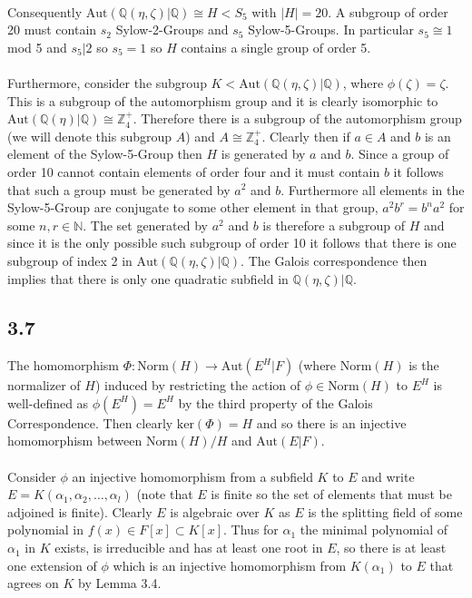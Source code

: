 \documentclass{article}
\begin{document}
\paragraph{}
Consequently $\text{Aut}(\mathbb{Q}(\eta,\zeta)|\mathbb{Q}) \cong H < S_5$ with $|H| = 20$. A subgroup 
of order 20 must contain $s_2$ Sylow-2-Groups and $s_5$ Sylow-5-Groups. In particular $s_5 \cong 1$ 
mod 5 and $s_5 | 2$ so $s_5 = 1$ 
so $H$ contains a single group of order 5.

\paragraph{}
Furthermore, consider the subgroup $K < \text{Aut}(\mathbb{Q}(\eta,\zeta)|\mathbb{Q})$, where 
$\phi(\zeta) = \zeta$. This is a subgroup of the automorphism group and it is clearly isomorphic 
to $\text{Aut}(\mathbb{Q}(\eta)|\mathbb{Q}) \cong \mathbb{Z}_4^+$. Therefore there is a subgroup of the 
automorphism group (we will denote this subgroup $A$) and $A \cong \mathbb{Z}_4^+$. Clearly then if $a \in A$ 
and $b$ is an element of the Sylow-5-Group then $H$ is generated by $a$ and $b$. Since a 
group of order 10 cannot contain elements of order four and it must contain $b$ it follows that 
such a group must be generated by $a^2$ and $b$. Furthermore all elements in the Sylow-5-Group 
are conjugate to some other element in that group, $a^2b^r = b^na^2$ for some $n,r \in \mathbb{N}$. 
The set generated by $a^2$ and $b$ is therefore a subgroup of $H$ and since it is the only 
possible such subgroup of order 10 it follows that there is one subgroup of index 2 in $\text{Aut}(\mathbb{Q}(\eta,\zeta)|\mathbb{Q})$. 
The Galois correspondence then implies that there is only one quadratic subfield in $\mathbb{Q}(\eta,\zeta)|\mathbb{Q}$.

\subsection*{3.7}
The homomorphism $\Phi:\text{Norm}(H) \rightarrow \text{Aut}(E^H|F)$ (where $\text{Norm}(H)$ is 
the normalizer of $H$) induced by restricting the 
action of $\phi \in \text{Norm}(H)$ to $E^H$ is well-defined as $\phi(E^H) = E^H$ by the third 
property of the Galois Correspondence. Then clearly $\text{ker}(\Phi) = H$ and so there is an 
injective homomorphism between $\text{Norm}(H)/H$ and $\text{Aut}(E|F)$.

\paragraph{}
Consider $\phi$ an injective homomorphism from a subfield $K$ to $E$ and write 
$E = K(\alpha_1,\alpha_2,\dots,\alpha_l)$ 
(note that $E$ is finite so the set of elements that must be adjoined is finite). 
Clearly $E$ is algebraic over $K$ as $E$ is the splitting field of some polynomial in 
$f(x) \in F[x] \subset K[x]$. Thus for $\alpha_1$ the minimal polynomial of $\alpha_1$ in 
$K$ exists, is irreducible and has at least one root in $E$, so there is at least one extension of 
$\phi$ which is an injective homomorphism from $K(\alpha_1)$ to $E$ that agrees on $K$ by Lemma 3.4.
\end{document}
